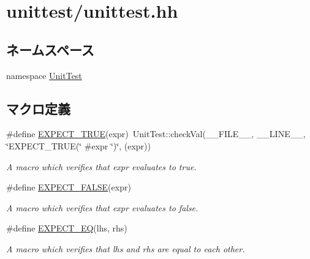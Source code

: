 \hypertarget{unittest_8hh}{
\section{unittest/unittest.hh}
\label{unittest_8hh}
}
\subsection*{ネームスペース}
\begin{DoxyCompactItemize}
\item 
namespace \hyperlink{namespaceUnitTest}{UnitTest}
\end{DoxyCompactItemize}
\subsection*{マクロ定義}
\begin{DoxyCompactItemize}
\item 
\#define \hyperlink{unittest_8hh_a160011a1d2f68d002f76eef2263489e6}{EXPECT\_\-TRUE}(expr)~UnitTest::checkVal(\_\-\_\-FILE\_\-\_\-, \_\-\_\-LINE\_\-\_\-, \char`\"{}EXPECT\_\-TRUE(\char`\"{} \#expr \char`\"{})\char`\"{}, (expr))
\begin{DoxyCompactList}\small\item\em A macro which verifies that expr evaluates to true. \item\end{DoxyCompactList}\item 
\#define \hyperlink{unittest_8hh_a485fd1c70a0d98dd4d38a2deeafe95b8}{EXPECT\_\-FALSE}(expr)
\begin{DoxyCompactList}\small\item\em A macro which verifies that expr evaluates to false. \item\end{DoxyCompactList}\item 
\#define \hyperlink{unittest_8hh_aa3e555662b0eca178fd8a576e9000f95}{EXPECT\_\-EQ}(lhs, rhs)
\begin{DoxyCompactList}\small\item\em A macro which verifies that lhs and rhs are equal to each other. \item\end{DoxyCompactList}\end{DoxyCompactItemize}
